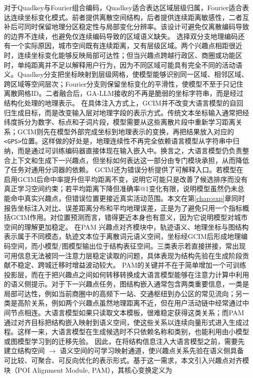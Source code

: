 对于Quadkey与Fourier组合编码，Quadkey适合表达区域层级归属，Fourier适合表达连续坐标变化模式\cite{GeoSAN,STiSAN,liu2026gallm}。前者提供离散空间结构，后者提供连续距离敏感性，二者互补后可同时保留地理分区稳定性与局部变化分辨率。该设计可避免仅离散编码导致的边界不连续，也避免仅连续编码导致的区域语义缺失。
选择双分支地理编码还有一个实际原因，城市空间既有连续距离，又有层级区域。两个兴趣点相距很近时，连续坐标变化能够反映局部可达性；但当兴趣点跨越行政区、商圈或功能区时，单纯距离并不足以解释用户行为，因为不同区域可能具有完全不同的活动语义。Quadkey分支把坐标映射到层级网格，使模型能够识别同一区域、相邻区域、跨区域等空间层次；Fourier分支则保留坐标变化的平滑性，使模型不至于只记住离散网格ID。二者融合后，GA-LLM接收的不再是脆弱的坐标字符串，而是经过结构化处理的地理表示。
在具体注入方式上，GCIM并不改变大语言模型的自回归生成目标，而是改变输入层对地理字段的表示方式。传统文本坐标输入通常把经纬度拆分为数字、标点和子词片段，模型需要从这些离散片段中重新学习距离关系；GCIM则先在模型外部完成坐标到地理表示的变换，再把结果放入对应的\texttt{<GPS>}位置。这样做的好处是，地理连续性不再完全依赖语言模型从字符串中归纳，而是通过可训练编码器直接体现在输入嵌入中。换言之，大语言模型仍负责整合上下文和生成下一兴趣点，但坐标如何表达这一部分由专门模块承担，从而降低了任务对通用分词器的依赖。
GCIM还为错误分析提供了可解释入口。若模型在启用GCIM后命中率提升但平均距离不变，说明它可能只是改善了候选排序而没有真正学习空间约束；若平均距离下降但准确率@1变化有限，说明模型虽然仍未总能命中真实兴趣点，但错误位置更接近真实活动范围。本文在第\ref{chap:exp}章同时报告坐标注入对比、误差距离分布和平均地理误差，正是为了避免只用一个指标概括GCIM作用。对位置预测而言，错得更近本身也有意义，因为它说明模型对城市空间的理解更加稳定。
在PAM 兴趣点对齐模块中，轨迹语义、地理坐标与图结构表示属于不同模态，轨迹文本位于离散词元语义空间，坐标经GCIM后形成地理编码空间，而小模型/图模型输出位于结构表征空间。三类表示若直接拼接，常出现可用信息无法被同一注意力层稳定读取的问题，具体表现为结构先验在生成阶段贡献不稳定、跨城迁移时增益波动较大。
PAM的关键并不在于简单增加一个可训练投影层，而在于把兴趣点之间如何转移转换成大语言模型能够在注意力计算中利用的语义侧提示。对于下一兴趣点任务，图结构嵌入通常包含两类重要信息，一类是局部可达性，例如当前商圈中的高频下一站、交通枢纽到办公区的常见流向；另一类是高阶关系，例如两个兴趣点虽然地理距离不近，但在用户活动链中经常通过中间节点相连。大语言模型如果只读取文本模板，很难稳定获得这类关系；而PAM通过对齐目标把结构嵌入映射到语义空间，使这些关系以连续向量形式进入生成过程。这样一来，大语言模型在生成候选时不只依赖名称和类别，也能利用由小模型或图模型学习到的迁移先验。
因此，在将结构信息注入大语言模型之前，需要先建立结构空间 $\rightarrow$ 语义空间的可学习映射通道，使兴趣点关系先验在语义侧具备可比较、可聚合、可反向优化的表示形式。基于这一需求，本文引入兴趣点对齐模块（POI Alignment Module, PAM），其核心变换定义为
